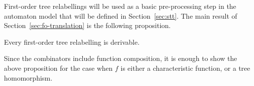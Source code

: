 

First-order tree relabellings will be used as a basic pre-processing step in the automaton model that will be defined in Section~\ref{sec:stt}.
The main  result of Section~\ref{sec:fo-translation} is the following proposition. 
\begin{proposition} \label{prop:forat}    
    Every first-order tree relabelling is derivable.
\end{proposition}       
Since the combinators include function composition, it is enough to show the above proposition for the case when $f$ is either a characteristic function, or a tree homomorphism. 

